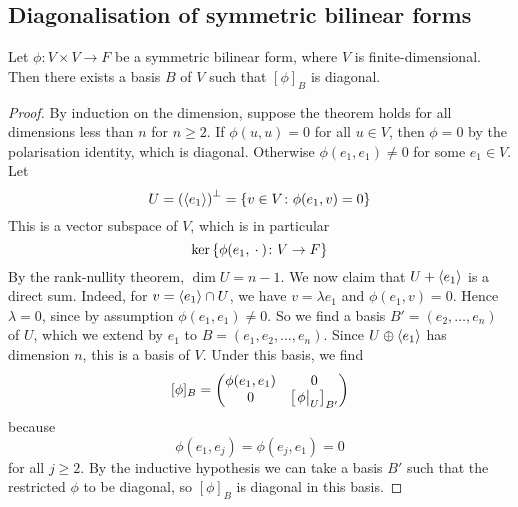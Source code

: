 \subsection{Diagonalisation of symmetric bilinear forms}
\begin{theorem}
	Let \( \phi \colon V \times V \to F \) be a symmetric bilinear form, where \( V \) is finite-dimensional.
	Then there exists a basis \( B \) of \( V \) such that \( [\phi]_B \) is diagonal.
\end{theorem}
\begin{proof}
	By induction on the dimension, suppose the theorem holds for all dimensions less than \( n \) for \( n \geq 2 \).
	If \( \phi(u,u) = 0 \) for all \( u \in V \), then \( \phi = 0 \) by the polarisation identity, which is diagonal.
	Otherwise \( \phi(e_1, e_1) \neq 0 \) for some \( e_1 \in V \).
	Let
	\[
		U = \qty(\langle{} e_1 \rangle)^\perp = \qty{v \in V \colon \phi(e_1, v) = 0}
	\]
	This is a vector subspace of \( V \), which is in particular
	\[
		\ker \qty{ \phi(e_1, {}\cdot{}) \colon V \to F }
	\]
	By the rank-nullity theorem, \( \dim U = n - 1 \).
	We now claim that \( U + \langle{} e_1 \rangle \) is a direct sum.
	Indeed, for \( v = \langle{} e_1 \rangle \cap U \), we have \( v = \lambda e_1 \) and \( \phi(e_1, v) = 0 \).
	Hence \( \lambda = 0 \), since by assumption \( \phi(e_1, e_1) \neq 0 \).
	So we find a basis \( B' = (e_2, \dots, e_n) \) of \( U \), which we extend by \( e_1 \) to \( B = (e_1, e_2, \dots, e_n) \).
	Since \( U \oplus \langle{} e_1 \rangle \) has dimension \( n \), this is a basis of \( V \).
	Under this basis, we find
	\[
		[\phi]_B = \begin{pmatrix}
			\phi(e_1, e_1) & 0                          \\
			0              & \qty[\eval{\phi}_{U}]_{B'}
		\end{pmatrix}
	\]
	because
	\[
		\phi(e_1, e_j) = \phi(e_j, e_1) = 0
	\]
	for all \( j \geq 2 \).
	By the inductive hypothesis we can take a basis \( B' \) such that the restricted \( \phi \) to be diagonal, so \( [\phi]_B \) is diagonal in this basis.
\end{proof}
